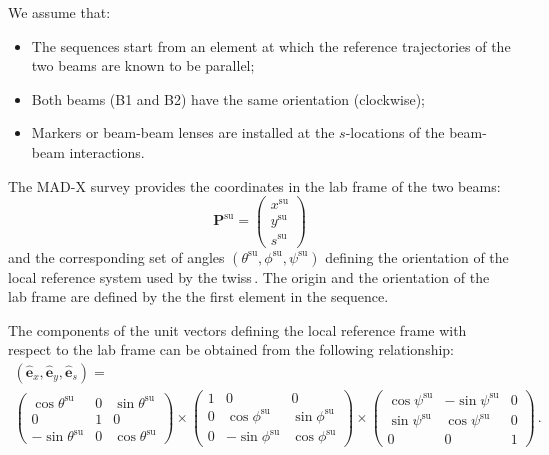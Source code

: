 We assume that:
\begin{itemize}
    \item The sequences start from an element at which the reference trajectories of the two beams are known to be parallel;
    \item Both beams (B1 and B2) have the same orientation (clockwise);
    \item Markers or beam-beam lenses are installed at the $s$-locations of the beam-beam interactions.
\end{itemize}

The MAD-X survey provides the coordinates in the lab frame of the two beams:
\begin{equation}
    \textbf{P}^\text{su} = \left(
    \begin{array}{c}
         x^\text{su}\\
         y^\text{su}\\
         s^\text{su}
    \end{array}\right)
\end{equation}
and the corresponding set of angles $(\theta^\text{su}, \phi^\text{su}, \psi^\text{su})$ defining the orientation of the local reference system used by the twiss\,\cite{madsite}. The origin and the orientation of the lab frame are defined by the the first element in the sequence.

The components of the unit vectors defining the local reference frame with respect to the lab frame can be obtained from the following relationship:
\begin{multline}
\left(\hat{\textbf{e}}_x, \hat{\textbf{e}}_y, \hat{\textbf{e}}_s\right)=\\
\left(\begin{array}{ccc}
\cos \theta^\text{su} & 0 & \sin \theta^\text{su} \\
0 & 1 & 0 \\
-\sin \theta^\text{su} & 0 & \cos \theta^\text{su}
\end{array}\right)
\times
\left(\begin{array}{ccc}
1 & 0 & 0 \\
0 & \cos \phi^\text{su} & \sin \phi^\text{su} \\
0 & -\sin \phi^\text{su} & \cos \phi^\text{su}
\end{array}\right)
\times
\left(\begin{array}{ccc}
\cos \psi^\text{su} & -\sin \psi^\text{su} & 0 \\
\sin \psi^\text{su} & \cos \psi^\text{su} & 0 \\
0 & 0 & 1
\end{array}\right)   \, .
\end{multline}

